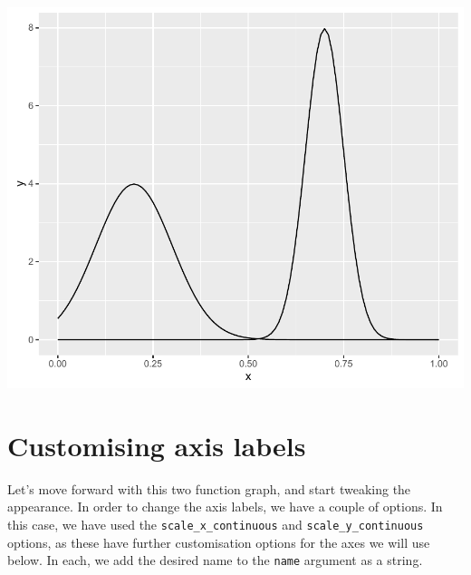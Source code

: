 \begin{Shaded}
\begin{Highlighting}[]
\StringTok{ }\NormalTok{(}\NormalTok{(} \NormalTok{(}\NormalTok{, }\NormalTok{)), }\NormalTok{(} 
\StringTok{  }\NormalTok{(}  \NormalTok{(}\NormalTok{, }\NormalTok{)) +}
\StringTok{  }\NormalTok{(}  \NormalTok{(}\NormalTok{, }\NormalTok{))}
\end{Highlighting}
\end{Shaded}

\begin{center}\includegraphics[width=0.6\linewidth]{9_Function_Plots_pdf/function_4-1} \end{center}

\section{Customising axis labels}\label{customising-axis-labels}

Let's move forward with this two function graph, and start tweaking the
appearance. In order to change the axis labels, we have a couple of
options. In this case, we have used the \texttt{scale\_x\_continuous}
and \texttt{scale\_y\_continuous} options, as these have further
customisation options for the axes we will use below. In each, we add
the desired name to the \texttt{name} argument as a string.

\begin{Shaded}
\begin{Highlighting}[]
\StringTok{ }\StringTok{ }\NormalTok{(} \NormalTok{) +}
\StringTok{  }\NormalTok{(} \NormalTok{)}
\end{Highlighting}
\end{Shaded}

